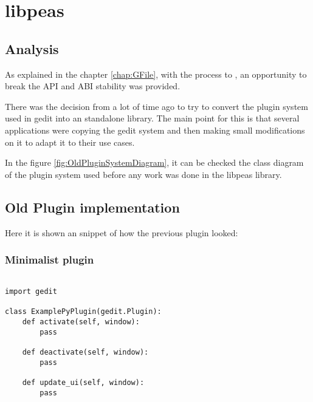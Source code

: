 
\chapter{libpeas}

\section{Analysis}

As explained in the chapter \ref{chap:GFile}, with the process to , an opportunity to break the API and ABI stability was provided.

There was the decision from a lot of time ago to try to convert the plugin system used in gedit into an standalone library. The main point for this is that several applications were copying the gedit system and then making small modifications on it to adapt it to their use cases.


\newpage
In the figure \ref{fig:OldPluginSystemDiagram}, it can be checked the class diagram of the plugin system used before any work was done in the libpeas library.





\section{Old Plugin implementation}

Here it is shown an snippet of how the previous plugin looked:

\subsection{Minimalist plugin}

\begin{lstlisting}[style=python]

import gedit

class ExamplePyPlugin(gedit.Plugin):
    def activate(self, window):
        pass

    def deactivate(self, window):
        pass

    def update_ui(self, window):
        pass

\end{lstlisting}

